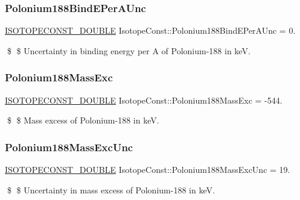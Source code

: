 \subsubsection{\texorpdfstring{Polonium188\+Bind\+E\+Per\+A\+Unc}{Polonium188BindEPerAUnc}}
{\footnotesize\ttfamily \mbox{\hyperlink{group___isotope_const-_macros_ga8f45a7272ce02c0b4c65c44636ed719a}{I\+S\+O\+T\+O\+P\+E\+C\+O\+N\+S\+T\+\_\+\+D\+O\+U\+B\+LE}} Isotope\+Const\+::\+Polonium188\+Bind\+E\+Per\+A\+Unc = 0.}

\$ \$ Uncertainty in binding energy per A of Polonium-\/188 in keV. \mbox{\label{group___isotope_const-_polonium-_po188_ga9696e33684057577a9fb3258e48c291c}} 
\subsubsection{\texorpdfstring{Polonium188\+Mass\+Exc}{Polonium188MassExc}}
{\footnotesize\ttfamily \mbox{\hyperlink{group___isotope_const-_macros_ga8f45a7272ce02c0b4c65c44636ed719a}{I\+S\+O\+T\+O\+P\+E\+C\+O\+N\+S\+T\+\_\+\+D\+O\+U\+B\+LE}} Isotope\+Const\+::\+Polonium188\+Mass\+Exc = -\/544.}

\$ \$ Mass excess of Polonium-\/188 in keV. \mbox{\label{group___isotope_const-_polonium-_po188_gacda168e30c295162ab2082ba7697e5e4}} 
\subsubsection{\texorpdfstring{Polonium188\+Mass\+Exc\+Unc}{Polonium188MassExcUnc}}
{\footnotesize\ttfamily \mbox{\hyperlink{group___isotope_const-_macros_ga8f45a7272ce02c0b4c65c44636ed719a}{I\+S\+O\+T\+O\+P\+E\+C\+O\+N\+S\+T\+\_\+\+D\+O\+U\+B\+LE}} Isotope\+Const\+::\+Polonium188\+Mass\+Exc\+Unc = 19.}

\$ \$ Uncertainty in mass excess of Polonium-\/188 in keV. \mbox{\label{group___isotope_const-_polonium-_po188_gaa769056c2d9b77682f2481a7ca926892}} 
